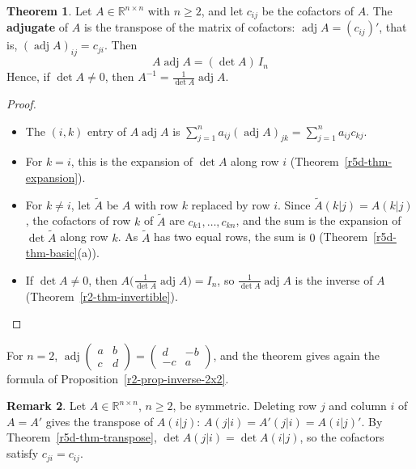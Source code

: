 \documentclass[12pt]{article}
\newcommand{\R}{\mathbb R}
\theoremstyle{definition}
\newtheorem{theorem}{Theorem}
\newtheorem{remark}[theorem]{Remark}
\begin{document}
\begin{theorem}\label{r5d-thm-adjugate}
Let \(A\in\R^{n\times n}\) with \(n\geqslant2\), and let \(c_{ij}\) be the cofactors of \(A\). The
\textbf{adjugate} of \(A\) is the transpose of the matrix of cofactors: \(\operatorname{adj}A=(c_{ij})'\),
that is, \((\operatorname{adj}A)_{ij}=c_{ji}\). Then
\[
A\operatorname{adj}A=(\det A)\,I_n
\]
Hence, if \(\det A\ne0\), then \(A^{-1}=\frac1{\det A}\operatorname{adj}A\).
\end{theorem}
\begin{proof}
\begin{itemize}
\item The \((i,k)\) entry of \(A\operatorname{adj}A\) is
\(\sum_{j=1}^na_{ij}(\operatorname{adj}A)_{jk}=\sum_{j=1}^na_{ij}c_{kj}\).
\item For \(k=i\), this is the expansion of \(\det A\) along row \(i\) (Theorem~\ref{r5d-thm-expansion}).
\item For \(k\ne i\), let \(\tilde A\) be \(A\) with row \(k\) replaced by row \(i\). Since
\(\tilde A(k|j)=A(k|j)\), the cofactors of row \(k\) of \(\tilde A\) are \(c_{k1},\dots,c_{kn}\), and the
sum is the expansion of \(\det\tilde A\) along row \(k\). As \(\tilde A\) has two equal rows, the sum is
\(0\) (Theorem~\ref{r5d-thm-basic}(a)).
\item If \(\det A\ne0\), then \(A\bigl(\frac1{\det A}\operatorname{adj}A\bigr)=I_n\), so
\(\frac1{\det A}\operatorname{adj}A\) is the inverse of \(A\) (Theorem~\ref{r2-thm-invertible}).\qedhere
\end{itemize}
\end{proof}
For \(n=2\), \(\operatorname{adj}\left(\begin{smallmatrix}a&b\\c&d\end{smallmatrix}\right)
=\left(\begin{smallmatrix}d&-b\\-c&a\end{smallmatrix}\right)\), and the theorem gives again the formula of
Proposition~\ref{r2-prop-inverse-2x2}.

\begin{remark}\label{r5d-rem-symmetric-cofactors}
Let \(A\in\R^{n\times n}\), \(n\geqslant2\), be symmetric. Deleting row \(j\) and column \(i\) of
\(A=A'\) gives the transpose of \(A(i|j)\): \(A(j|i)=A'(j|i)=A(i|j)'\). By
Theorem~\ref{r5d-thm-transpose}, \(\det A(j|i)=\det A(i|j)\), so the cofactors satisfy
\(c_{ji}=c_{ij}\).
\end{remark}
\end{document}
